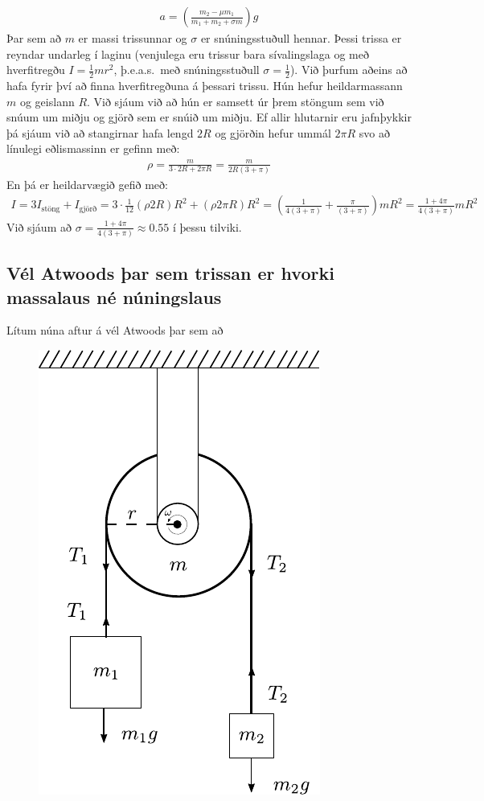 \begin{align*}
    a = \left(\frac{m_2 - \mu m_1}{m_1 + m_2 + \sigma m}\right) g
\end{align*}
Þar sem að $m$ er massi trissunnar og $\sigma$ er snúningsstuðull hennar. Þessi trissa er reyndar undarleg í laginu (venjulega eru trissur bara sívalingslaga og með hverfitregðu $I = \frac{1}{2}mr^2$, þ.e.a.s.~með snúningsstuðull $\sigma = \frac{1}{2}$). Við þurfum aðeins að hafa fyrir því að finna hverfitregðuna 
á þessari trissu. Hún hefur heildarmassann $m$ og geislann $R$. Við sjáum við að hún er samsett úr þrem stöngum sem við snúum um miðju og gjörð sem er snúið um miðju. Ef allir hlutarnir eru jafnþykkir þá sjáum við að stangirnar hafa lengd $2R$ og gjörðin hefur ummál $2\pi R$ svo að línulegi eðlismassinn er gefinn með:
\begin{align*}
    \rho = \frac{m}{3\cdot 2R + 2\pi R} = \frac{m}{2R(3 + \pi)}
\end{align*}
En þá er heildarvægið gefið með:
\begin{align*}
    I =3 I_{\text{stöng}} + I_{\text{gjörð}} = 3 \cdot \frac{1}{12}(\rho 2R) R^2 + (\rho 2\pi R)R^2 = \left( \frac{1}{4(3+\pi)} + \frac{\pi}{(3+\pi)}  \right)mR^2 = \frac{1+4\pi}{4(3+\pi)} mR^2
\end{align*}
Við sjáum að $\sigma = \frac{1+4\pi}{4(3+\pi)} \approx 0.55$ í þessu tilviki.


\subsection*{Vél Atwoods þar sem trissan er hvorki massalaus né núningslaus}

Lítum núna aftur á vél Atwoods þar sem að 

\begin{figure}[H]
    \centering
    \includegraphics[scale=0.8]{figures/atwoodrot4.pdf}
\end{figure}

